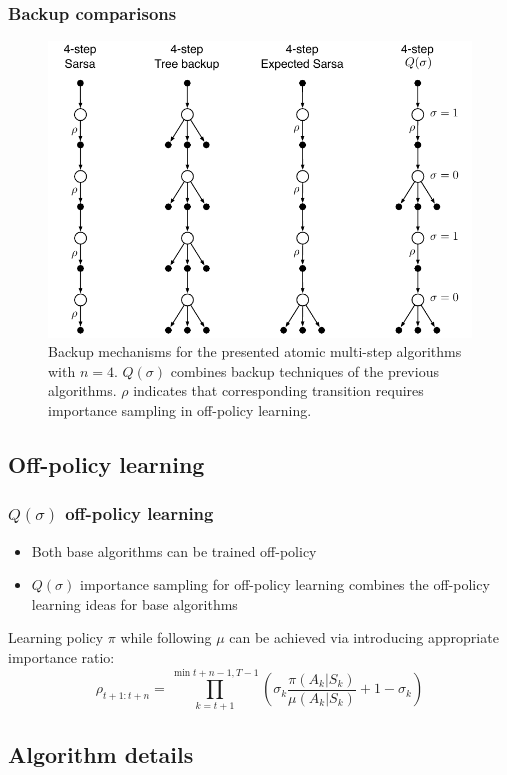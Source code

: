 \documentclass{beamer}
\begin{document}
\begin{frame}
  \frametitle{Backup comparisons}
  \begin{figure}
    \centering
    \includegraphics[width=0.6 \textwidth]{all_multi_step_backups}
    \caption{Backup mechanisms for the presented atomic multi-step algorithms
      with $n = 4$. $Q(\sigma)$ combines backup techniques of the previous
      algorithms. $\rho$ indicates that corresponding transition requires
      importance sampling in off-policy learning.}
  \end{figure}
\end{frame}

\subsection{Off-policy learning}

\begin{frame}
  \frametitle{$Q(\sigma)$ off-policy learning}
  \begin{itemize}
    \item Both base algorithms can be trained off-policy
    \item $Q(\sigma)$ importance sampling for off-policy learning combines the
    off-policy learning ideas for base algorithms
  \end{itemize}
  Learning policy $\pi$ while following $\mu$ can be achieved via introducing
  appropriate importance ratio:
  $$\rho_{t + 1 : t + n} = \prod_{k = t + 1}^{\min{t + n - 1, T - 1}}
    (\sigma_k \frac{\pi(A_k | S_k)}{\mu(A_k | S_k)} + 1 - \sigma_k)$$
\end{frame}

\subsection{Algorithm details}
\end{document}
